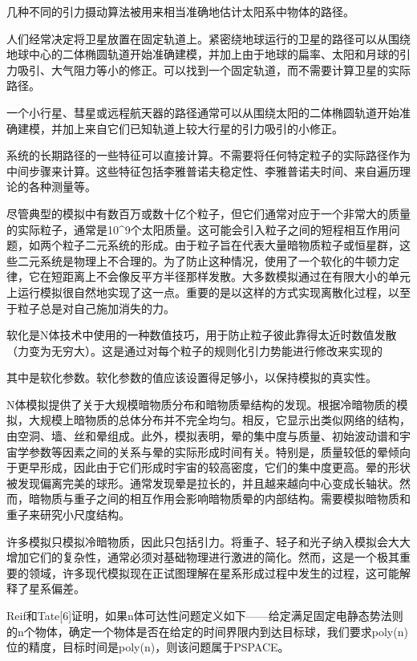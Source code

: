 几种不同的引力摄动算法被用来相当准确地估计太阳系中物体的路径。

人们经常决定将卫星放置在固定轨道上。紧密绕地球运行的卫星的路径可以从围绕地球中心的二体椭圆轨道开始准确建模，并加上由于地球的扁率、太阳和月球的引力吸引、大气阻力等小的修正。可以找到一个固定轨道，而不需要计算卫星的实际路径。

一个小行星、彗星或远程航天器的路径通常可以从围绕太阳的二体椭圆轨道开始准确建模，并加上来自它们已知轨道上较大行星的引力吸引的小修正。

系统的长期路径的一些特征可以直接计算。不需要将任何特定粒子的实际路径作为中间步骤来计算。这些特征包括李雅普诺夫稳定性、李雅普诺夫时间、来自遍历理论的各种测量等。

尽管典型的模拟中有数百万或数十亿个粒子，但它们通常对应于一个非常大的质量的实际粒子，通常是10^9个太阳质量。这可能会引入粒子之间的短程相互作用问题，如两个粒子二元系统的形成。由于粒子旨在代表大量暗物质粒子或恒星群，这些二元系统是物理上不合理的。为了防止这种情况，使用了一个软化的牛顿力定律，它在短距离上不会像反平方半径那样发散。大多数模拟通过在有限大小的单元上运行模拟很自然地实现了这一点。重要的是以这样的方式实现离散化过程，以至于粒子总是对自己施加消失的力。

软化是N体技术中使用的一种数值技巧，用于防止粒子彼此靠得太近时数值发散（力变为无穷大）。这是通过对每个粒子的规则化引力势能进行修改来实现的

其中是软化参数。软化参数的值应该设置得足够小，以保持模拟的真实性。

N体模拟提供了关于大规模暗物质分布和暗物质晕结构的发现。根据冷暗物质的模拟，大规模上暗物质的总体分布并不完全均匀。相反，它显示出类似网络的结构，由空洞、墙、丝和晕组成。此外，模拟表明，晕的集中度与质量、初始波动谱和宇宙学参数等因素之间的关系与晕的实际形成时间有关。特别是，质量较低的晕倾向于更早形成，因此由于它们形成时宇宙的较高密度，它们的集中度更高。晕的形状被发现偏离完美的球形。通常发现晕是拉长的，并且越来越向中心变成长轴状。然而，暗物质与重子之间的相互作用会影响暗物质晕的内部结构。需要模拟暗物质和重子来研究小尺度结构。

许多模拟只模拟冷暗物质，因此只包括引力。将重子、轻子和光子纳入模拟会大大增加它们的复杂性，通常必须对基础物理进行激进的简化。然而，这是一个极其重要的领域，许多现代模拟现在正试图理解在星系形成过程中发生的过程，这可能解释了星系偏差。

Reif和Tate[6]证明，如果n体可达性问题定义如下——给定满足固定电静态势法则的n个物体，确定一个物体是否在给定的时间界限内到达目标球，我们要求poly(n)位的精度，目标时间是poly(n)，则该问题属于PSPACE。

